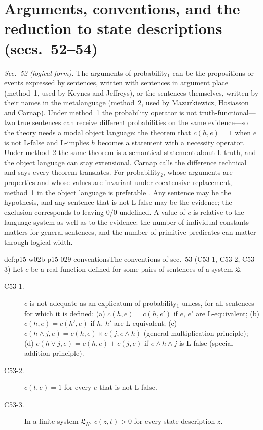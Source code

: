 \section{Arguments, conventions, and the reduction to state descriptions (secs.~52--54)}
\label{sec:p15-w02b-p15-029-conventions}

\emph{Sec.~52 (logical form).} The arguments of probability\(_1\) can
be the propositions or events expressed by sentences, written with
sentences in argument place (method~1, used by Keynes and Jeffreys), or
the sentences themselves, written by their names in the metalanguage
(method~2, used by Mazurkiewicz, Hosiasson and Carnap). Under method~1
the probability operator is not truth-functional---two true sentences
can receive different probabilities on the same evidence---so the
theory needs a modal object language: the theorem that \(c(h,e)=1\)
when \(e\) is not L-false and L-implies \(h\) becomes a statement with a
necessity operator. Under method~2 the same theorem is a semantical
statement about L-truth, and the object language can stay extensional.
Carnap calls the difference technical and says every theorem
translates. For probability\(_2\), whose arguments are properties and
whose values are invariant under coextensive replacement, method~1 in
the object language is preferable \cite[sec.~52, pp.~279--284]{Carnap1950Probability}.
Any sentence may be the hypothesis, and any sentence that is not
L-false may be the evidence; the exclusion corresponds to leaving
\(0/0\) undefined. A value of \(c\) is relative to the language system
as well as to the evidence: the number of individual constants matters
for general sentences, and the number of primitive predicates can
matter through logical width.

\begin{hbdefinition}{def:p15-w02b-p15-029-conventions}{The conventions of sec.~53 (C53-1, C53-2, C53-3)}
Let \(c\) be a real function defined for some pairs of sentences of a
system \(\mathfrak L\).
\begin{description}
 \item[C53-1.] \(c\) is not adequate as an explicatum of
   probability\(_1\) unless, for all sentences for which it is defined:
   (a) \(c(h,e)=c(h,e')\) if \(e\), \(e'\) are L-equivalent;
   (b) \(c(h,e)=c(h',e)\) if \(h\), \(h'\) are L-equivalent;
   (c) \(c(h\land j,e)=c(h,e)\times c(j,e\land h)\) (general
   multiplication principle);
   (d) \(c(h\lor j,e)=c(h,e)+c(j,e)\) if \(e\land h\land j\) is
   L-false (special addition principle).
 \item[C53-2.] \(c(t,e)=1\) for every \(e\) that is not L-false.
 \item[C53-3.] In a finite system \(\mathfrak L_N\), \(c(z,t)>0\) for
   every state description \(z\).
\end{description}
\end{hbdefinition}

